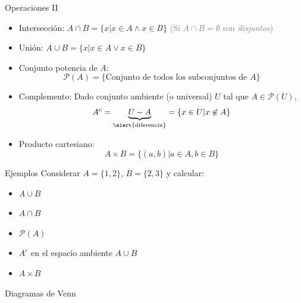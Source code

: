 \documentclass[14pt,aspectratio=169,xcolor=dvipsnames]{beamer}
\begin{document}
\begin{frame}{Operaciones II}
    \begin{small}
    \begin{itemize}
        \item Intersección:  $ A \cap B = \{ x | x\in A \wedge x\in B\} $ \hfill \textcolor{gray}{(Si $A\cap B = \emptyset$ son \emph{disjuntos})}
        \item Unión: $ A \cup B = \{ x | x\in A \vee x\in B\} $
        \item Conjunto potencia de $A$: 
            $$ \mathcal P(A) = \{ \text{Conjunto de todos los subconjuntos de $A$} \} $$
        \item Complemento: Dado conjunto ambiente (o universal) $U$ tal que $A\in \mathcal P(U)$, 
            $$ A^c = \underbrace{U - A}_\text{\alert{diferencia}} = \{x\in U | x \not\in A \} $$
        \item Producto cartesiano: 
            $$ A\times B = \{(a,b) | a \in A, b \in B \} $$
    \end{itemize}
    \end{small}
\end{frame}
\begin{frame}{Ejemplos}
    Considerar $A=\{1,2\}$, $B = \{2,3\}$ y calcular:
    \begin{itemize}
        \item $A\cup B$ 
        \item $A \cap B$  
        \item $\mathcal P(A)$ 
        \item $A^c$ en el espacio ambiente $A\cup B$ 
        \item $A\times B$ 
    \end{itemize}
\end{frame}
\begin{frame}{Diagramas de Venn}
\end{frame}
\end{document}
